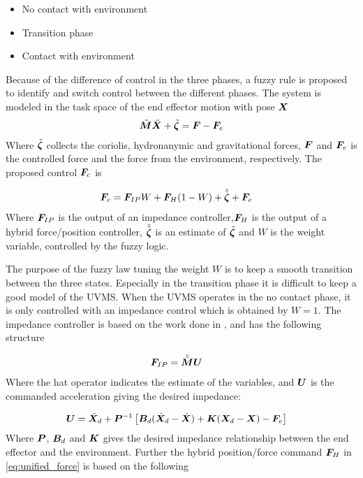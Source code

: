 \begin{itemize}
  \item No contact with environment
  \item Transition phase
  \item Contact with environment
\end{itemize}
Because of the difference of control in the three phases, a fuzzy rule is proposed to identify and switch control between the different phases. The system is modeled in the task space of the end effector motion with pose $\boldsymbol X$
\begin{align}
  \tilde{\boldsymbol M}\ddot{\boldsymbol X}  + \tilde{\boldsymbol \zeta} = \boldsymbol F - \boldsymbol F_e
	\label{eq:unified_model} 
\end{align}
Where $\tilde{\boldsymbol \zeta}$ collects the coriolis, hydronanymic and gravitational forces, $\boldsymbol F$ and $\boldsymbol F_e$ is the controlled force and the force from the environment, respectively. The proposed control $\boldsymbol F_c $ is

\begin{align}
  \boldsymbol F_c &=\boldsymbol F_{IP}W + \boldsymbol F_H(1-W )+ \hat{\tilde{\boldsymbol \zeta}} + \boldsymbol F_e 
  \label{eq:unified_force}
\end{align}
Where $\boldsymbol F_{IP}$ is the output of an impedance controller,$\boldsymbol F_{H}$ is the output of a hybrid force/position controller, $\hat{\tilde{\boldsymbol \zeta}}$ is an estimate of $\tilde{\boldsymbol \zeta}$ and $W$ is the weight variable, controlled by the fuzzy logic.

The purpose of the fuzzy law tuning the weight $W$ is to keep a smooth transition between the three states. Especially in the transition phase it is difficult to keep a good model of the UVMS. When the UVMS operates in the no contact phase, it is only controlled with an impedance control which is obtained by $W=1$. The impedance controller is based on the work done in \cite{impedance_stability}, and has the following structure

\begin{align}
  \bs  F_{IP} &= \hat{\tilde{\bs M}}\bs U %
  \label{eq:impedance_control}
\end{align}
Where the hat operator indicates the estimate of the variables, and $\boldsymbol U$ is the commanded acceleration giving the desired impedance:

\begin{align}
  \boldsymbol U&=\ddot{\boldsymbol X}_d + \boldsymbol P^{-1}\left[ \boldsymbol B_d(\dot{\boldsymbol X}_d-\dot{\boldsymbol X}) + \boldsymbol K(\boldsymbol X_d - \boldsymbol X) - \boldsymbol F_e\right]
  \label{eq:impedance_control2}
\end{align}
Where $\boldsymbol P$, $\boldsymbol B_d$ and $\boldsymbol K$ gives the desired impedance relationship between the end effector and the environment. Further the hybrid position/force command $\boldsymbol F_H$ in \eqref{eq:unified_force} is based on the following


